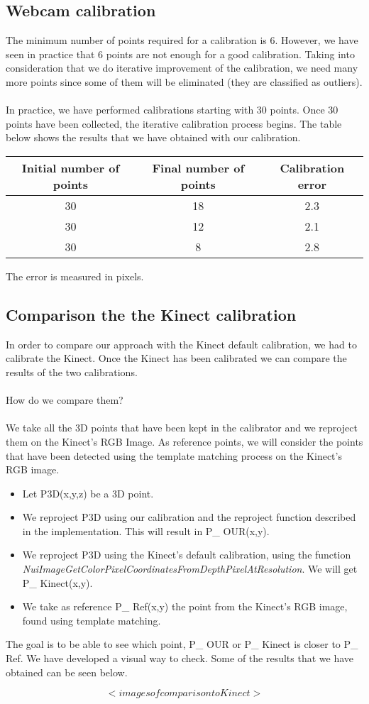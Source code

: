 \subsection{Webcam calibration}
The minimum number of points required for a calibration is 6. However, we have seen in practice that 6 points are not enough for a good calibration. Taking into consideration that we do iterative improvement of the calibration, we need many more points since some of them will be eliminated (they are classified as outliers). 
\\\\
In practice, we have performed calibrations starting with 30 points. Once 30 points have been collected, the iterative calibration process begins. The table below shows the results that we have obtained with our calibration. 

\begin{center}
  \begin{tabular}{| c | c | c |}
    \hline
    Initial number of points & Final number of points & Calibration error \\ \hline
    30 & 18 & 2.3 \\ \hline
    30 & 12 & 2.1 \\ \hline
    30 & 8 & 2.8 \\
    \hline
  \end{tabular}
\end{center}

\noindent
The error is measured in pixels. 

\subsection{Comparison the the Kinect calibration}
\noindent
In order to compare our approach with the Kinect default calibration, we had to calibrate the Kinect. Once the Kinect has been calibrated we can compare the results of the two calibrations.
\\\\
How do we compare them?
\\\\
We take all the 3D points that have been kept in the calibrator and we reproject them on the Kinect's RGB Image. As reference points, we will consider the points that have been detected using the template matching process on the Kinect's RGB image. 

\begin{itemize}
	\item Let P3D(x,y,z) be a 3D point.
	\item We reproject P3D using our calibration and the reproject function described in the implementation. This will result in P\_ OUR(x,y).
	\item We reproject P3D using the Kinect's default calibration, using the function \emph{NuiImageGetColorPixelCoordinatesFromDepthPixelAtResolution}. We will get P\_ Kinect(x,y).
	\item We take as reference P\_ Ref(x,y) the point from the Kinect's RGB image, found using template matching.
\end{itemize}

The goal is to be able to see which point, P\_ OUR or P\_ Kinect is closer to P\_ Ref. We have developed a visual way to check. Some of the results that we have obtained can be seen below.

$$ < images of comparison to Kinect >$$